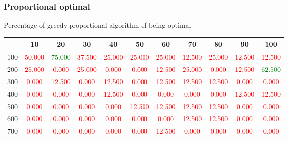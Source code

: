 \documentclass[12]{beamer}
\begin{document}
\begin{frame}
\frametitle{Proportional optimal }

Percentage of greedy proportional algorithm of being optimal
\begin{center}
\begin{adjustbox}{max width=\textwidth}
\small
\begin{tabular}{ |c|c|c|c|c|c|c|c|c|c|c|}
\hline
  & 10 & 20 & 30 & 40 & 50 & 60 & 70 & 80 & 90 & 100 \\ 
\hline
 100 &\textcolor{red}{50.000} &\textcolor{green}{75.000} &\textcolor{red}{37.500} &\textcolor{red}{25.000} &\textcolor{red}{25.000} &\textcolor{red}{25.000} &\textcolor{red}{12.500} &\textcolor{red}{25.000} &\textcolor{red}{12.500} &\textcolor{red}{12.500} \\ 
\hline
 200 &\textcolor{red}{25.000} &\textcolor{red}{0.000} &\textcolor{red}{25.000} &\textcolor{red}{0.000} &\textcolor{red}{0.000} &\textcolor{red}{12.500} &\textcolor{red}{25.000} &\textcolor{red}{0.000} &\textcolor{red}{12.500} &\textcolor{green}{62.500} \\ 
\hline
 300 &\textcolor{red}{0.000} &\textcolor{red}{12.500} &\textcolor{red}{0.000} &\textcolor{red}{12.500} &\textcolor{red}{0.000} &\textcolor{red}{12.500} &\textcolor{red}{12.500} &\textcolor{red}{12.500} &\textcolor{red}{0.000} &\textcolor{red}{0.000} \\ 
\hline
 400 &\textcolor{red}{0.000} &\textcolor{red}{0.000} &\textcolor{red}{0.000} &\textcolor{red}{12.500} &\textcolor{red}{0.000} &\textcolor{red}{0.000} &\textcolor{red}{0.000} &\textcolor{red}{0.000} &\textcolor{red}{12.500} &\textcolor{red}{12.500} \\ 
\hline
 500 &\textcolor{red}{0.000} &\textcolor{red}{0.000} &\textcolor{red}{0.000} &\textcolor{red}{0.000} &\textcolor{red}{12.500} &\textcolor{red}{12.500} &\textcolor{red}{12.500} &\textcolor{red}{12.500} &\textcolor{red}{0.000} &\textcolor{red}{0.000} \\ 
\hline
 600 &\textcolor{red}{0.000} &\textcolor{red}{0.000} &\textcolor{red}{0.000} &\textcolor{red}{0.000} &\textcolor{red}{0.000} &\textcolor{red}{0.000} &\textcolor{red}{12.500} &\textcolor{red}{12.500} &\textcolor{red}{0.000} &\textcolor{red}{0.000} \\ 
\hline
 700 &\textcolor{red}{0.000} &\textcolor{red}{0.000} &\textcolor{red}{0.000} &\textcolor{red}{0.000} &\textcolor{red}{0.000} &\textcolor{red}{12.500} &\textcolor{red}{0.000} &\textcolor{red}{0.000} &\textcolor{red}{0.000} &\textcolor{red}{0.000} \\ 

\end{tabular}
\end{adjustbox}
\end{center}
\end{frame}
\end{document}

